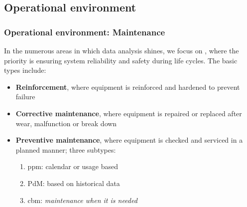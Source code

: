 \subsection{Operational environment}
\begin{frame}
    \frametitle{Operational environment: Maintenance}
    \vspace*{\fill}
    In the numerous areas in which data analysis shines, we focus on , where the
    priority is ensuring system reliability and safety during life cycles.
    The basic types include: %
    \begin{itemize}[<+-|alert@+>]
        \item \textbf{Reinforcement}, where equipment is reinforced and hardened to prevent failure
        \item \textbf{Corrective maintenance}, where equipment is repaired or replaced after wear, malfunction or break down
        \item \textbf{Preventive maintenance}, where equipment is checked and serviced in a planned manner; three subtypes:
              \begin{enumerate} %
                  \item \acl{ppm}: calendar or usage based
                  \item \acl{PdM}: based on historical data
                  \item \acl{cbm}: \textit{maintenance when it is needed}
              \end{enumerate}
    \end{itemize}
    \vspace*{\fill}
\end{frame}

